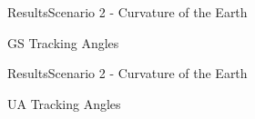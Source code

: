 \begin{frame}{Results}{Scenario 2 - Curvature of the Earth}
\begin{block}{GS Tracking Angles}
  \end{block}

\end{frame}



\begin{frame}{Results}{Scenario 2 - Curvature of the Earth}

  \begin{block}{UA Tracking Angles}  
  
  \begin{figure}[H]
    \centerline{
    \hfill
    }
\end{figure}
\end{block}
\end{frame}
